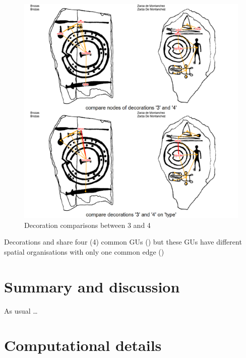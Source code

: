 \documentclass[article]{jss}\usepackage{knitr}
\begin{document}
\begin{knitrout}
\begin{figure}[H]
{\centering \includegraphics[width=\maxwidth]{figure/unnamed-chunk-18-1} 

}

\caption{\label{fig:figs}Decoration comparisons between 3 and 4}\label{fig:unnamed-chunk-18}
\end{figure}


\end{knitrout}

Decorations  and  share four (4) common GUs () but  these GUs have different spatial organisations with only one common edge ()


\section{Summary and discussion} \label{sec:summary}

\begin{leftbar}
As usual \dots
\end{leftbar}



\section*{Computational details}
\end{document}
